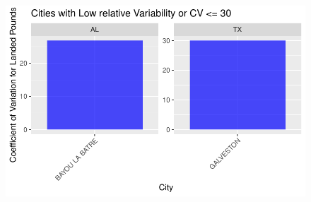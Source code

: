 \documentclass[
  letterpaper,
  DIV=11,
  numbers=noendperiod]{scrartcl}
\begin{document}
\begin{figure}[H]

{\centering \includegraphics{CV_Communities2_files/figure-pdf/unnamed-chunk-23-1.pdf}

}

\end{figure}
\end{document}
